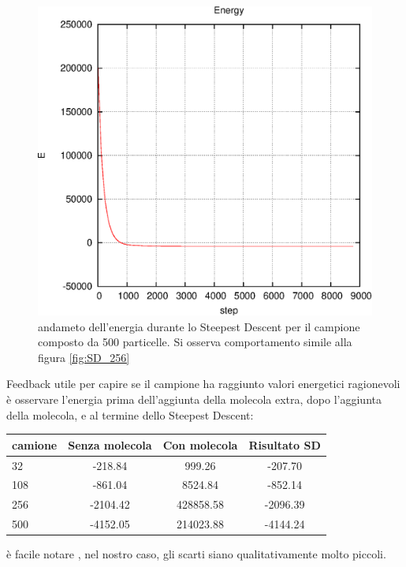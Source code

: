 \documentclass[a4paper,11pt]{article}
\begin{document}
			\begin{figure}[H]
				\centering
				\includegraphics[scale=0.7]{E_SD_500.eps}
				\caption{andameto dell'energia durante lo Steepest Descent per il campione composto da 500 particelle. Si osserva comportamento simile alla figura \ref{fig:SD_256}}
				\label{fig:SD_500}
			\end{figure}
		Feedback utile per capire se il campione ha raggiunto valori energetici ragionevoli è osservare l'energia prima dell'aggiunta della molecola extra, dopo l'aggiunta della molecola, e al termine dello Steepest Descent:
		\begin{table}[H]
			\centering
			\begin{tabular}{l|ccc}
			\hline
		
			\hline
			\textbf{camione} & \textbf{Senza molecola} & \textbf{Con molecola} & \textbf{Risultato SD} \\
			\hline
				32	 & -218.84 	 & 999.26 	& 	-207.70 \\
				108 & 	-861.04	 & 	8524.84 & 	-852.14 \\
				256 & 	-2104.42 & 	428858.58 	& -2096.39 \\
				500 & 	-4152.05 & 	214023.88	& -4144.24 \\
			\hline
		
			\hline
			\end{tabular}
		\end{table}
		è facile notare , nel nostro caso, gli scarti siano qualitativamente molto piccoli.
\end{document}
